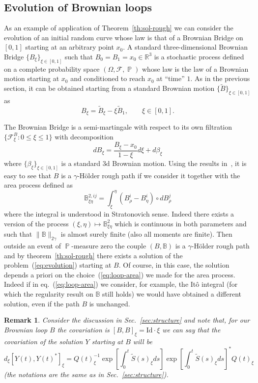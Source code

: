 \documentclass[a4paper,12pt,reqno]{amsart}
\DeclareMathOperator{\prob}{{\mathbb P}}
\newcommand{\wt}{\widetilde}
\newtheorem{remark}{Remark}
\begin{document}
\subsection{Evolution of Brownian loops}
\label{sec:brownian}
As an example of application of Theorem~\ref{th:sol-rough} we can consider
the evolution of an initial random curve whose law is that of a
Brownian Bridge on $[0,1]$ starting at an arbitrary point $x_0$. A standard
three-dimensional Brownian Bridge $\{B_\xi\}_{\xi \in[0,1]}$ such that $B_0 =
B_1 = x_0 \in \mathbb{R}^3$ is a stochastic process defined on a
complete probability space $(\Omega,\mathcal{F},\prob)$ whose law is the law of
a Brownian motion starting at $x_0$ and conditioned to reach $x_0$ at
``time'' $1$. As in the previous section, it can be obtained starting
from a standard Brownian motion $\{ \wt B\}_{\xi \in [0,1]}$ as
$$
B_\xi = \wt B_{\xi} - \xi \wt B_1, \qquad \xi \in [0,1].
$$

The Brownian Bridge is a semi-martingale with respect to its
own filtration $\{\mathcal{F}^B_\xi : 0 \le \xi \le 1\}$ with
decomposition
$$
dB_\xi = \frac{B_\xi - x_0}{1-\xi} d\xi + d\beta_\xi
$$
where $\{\beta_\xi\}_{\xi \in [0,1]}$ is a standard 3d Brownian motion. Using
the results in~\cite{Gubinelli}, it is easy to see that $B$ is a
$\gamma$-H\"older rough path if we consider it together with the area
process defined as
\begin{equation}
  \label{eq:loop-area}
\mathbb{B}^{2,ij}_{\xi\eta} = \int_\xi^\eta (B^i_\rho-B^i_\eta) \circ dB_\rho^j  \end{equation}
where the integral is understood in Stratonovich sense. Indeed there
exists a version of the process
$(\xi,\eta) \mapsto \mathbb{B}^2_{\xi\eta}$ which is continuous in
both parameters and such that $\|\mathbb{B}\|_{2\gamma}$ is almost
surely finite (also all moments are finite). Then outside an event of
$\prob$-measure zero the couple $(B,\mathbb{B})$ is a
$\gamma$-H\"older rough path and by theorem~\ref{th:sol-rough} there
exists a solution of the problem~(\ref{eq:evolution}) starting at
$B$. Of course, in this case, the solution depends a priori on the
choice~(\ref{eq:loop-area}) we made for the area process. Indeed if in
eq.~(\ref{eq:loop-area}) we consider, for example, the It\^o integral
(for which the regularity result on $\mathbb{B}$ still holds) we would
have obtained a different solution, even if the path $B$ is unchanged.

\begin{remark}
Consider the discussion in Sec.~\ref{sec:structure} and note that,
for our Brownian loop $B$ the covariation is
$[B,B]_\xi =  \text{Id}\cdot \xi$ we can say
that the covariation of the solution $Y$ starting at $B$ will
be
$$
d_\xi [Y(t),Y(t)^*]_\xi = 
 Q(t)_\xi^{-1} \exp\left[\int_0^t \widetilde S(s)_\xi ds\right]
\exp\left[\int_0^t \widetilde S(s)_\xi ds\right]^* Q(t)_\xi 
$$
(the notations are the same as in Sec.~\ref{sec:structure}).  
\end{remark}
\end{document}
